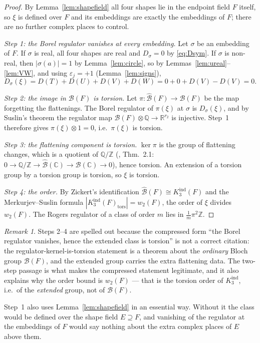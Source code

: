 \documentclass[11pt]{article}
\theoremstyle{remark}
\newtheorem{remark}[theorem]{Remark}
\newcommand{\CC}{\mathbb{C}}
\newcommand{\RR}{\mathbb{R}}
\newcommand{\QQ}{\mathbb{Q}}
\newcommand{\ZZ}{\mathbb{Z}}
\begin{document}
\begin{proof}
By Lemma~\ref{lem:shapefield} all four shapes lie in the endpoint field $F$
itself, so $\xi$ is defined over $F$ and its embeddings are exactly the
embeddings of $F$; there are no further complex places to control.

\emph{Step 1: the Borel regulator vanishes at every embedding.}
Let $\sigma$ be an embedding of $F$. If $\sigma$ is real, all four shapes are
real and $D_\sigma=0$ by \eqref{eq:Dsym}. If $\sigma$ is non-real, then
$|\sigma(a)|=1$ by Lemma~\ref{lem:circle}, so by
Lemmas~\ref{lem:ureal}--\ref{lem:VW}, and using $\varepsilon_j=+1$
(Lemma~\ref{lem:signs}),
\[
D_\sigma(\xi)=D(T)+D(U)+D(V)+D(W)=0+0+D(V)-D(V)=0 .
\]

\emph{Step 2: the image in $\mathcal B(F)$ is torsion.}
Let $\pi\colon\widehat{\mathcal B}(F)\to\mathcal B(F)$ be the map forgetting the
flattenings. The Borel regulator of $\pi(\xi)$ at $\sigma$ is $D_\sigma(\xi)$, and
by Suslin's theorem \cite{Suslin} the regulator map
$\mathcal B(F)\otimes\QQ\to\RR^{r_2}$ is injective. Step~1 therefore gives
$\pi(\xi)\otimes 1=0$, i.e.\ $\pi(\xi)$ is torsion.

\emph{Step 3: the flattening component is torsion.}
$\ker\pi$ is the group of flattening changes, which is a quotient of $\QQ/\ZZ$
(\cite{Neumann}, Thm.~2.1: $0\to\QQ/\ZZ\to\widehat{\mathcal B}(\CC)\to\mathcal B(\CC)\to0$),
hence torsion. An extension of a torsion group by a torsion group is torsion, so
$\xi$ is torsion.

\emph{Step 4: the order.}
By Zickert's identification $\widehat{\mathcal B}(F)\cong K_3^{\mathrm{ind}}(F)$
\cite{Zickert} and the Merkurjev--Suslin formula \cite{MS}
$|K_3^{\mathrm{ind}}(F)_{\mathrm{tors}}|=w_2(F)$, the order of $\xi$ divides
$w_2(F)$. The Rogers regulator of a class of order $m$ lies in
$\tfrac1m\pi^2\ZZ$.
\end{proof}

\begin{remark}
Steps 2--4 are spelled out because the compressed form ``the Borel regulator
vanishes, hence the extended class is torsion'' is not a correct citation:
the regulator-kernel-is-torsion statement is a theorem about the \emph{ordinary}
Bloch group $\mathcal B(F)$, and the extended group carries the extra flattening
data. The two-step passage is what makes the compressed statement legitimate, and
it also explains why the order bound is $w_2(F)$ --- that is the torsion order of
$K_3^{\mathrm{ind}}$, i.e.\ of the \emph{extended} group, not of
$\mathcal B(F)$.

Step~1 also uses Lemma~\ref{lem:shapefield} in an essential way. Without it the
class would be defined over the shape field $E\supseteq F$, and vanishing of the
regulator at the embeddings of $F$ would say nothing about the extra complex
places of $E$ above them.
\end{remark}
\end{document}
